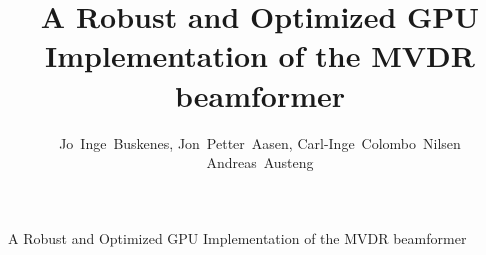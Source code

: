 \documentclass[12pt,journal,captionsoff,onecolumn]{IEEEtran}
\newcommand\1{\vec 1}
\begin{document}
\title{A Robust and Optimized GPU Implementation of the MVDR beamformer}

\author{Jo~Inge~Buskenes, %
        Jon~Petter~Aasen, %
        Carl-Inge~Colombo~Nilsen%
        Andreas~Austeng%

}

%
{A Robust and Optimized GPU Implementation of the MVDR beamformer}


\end{document}

